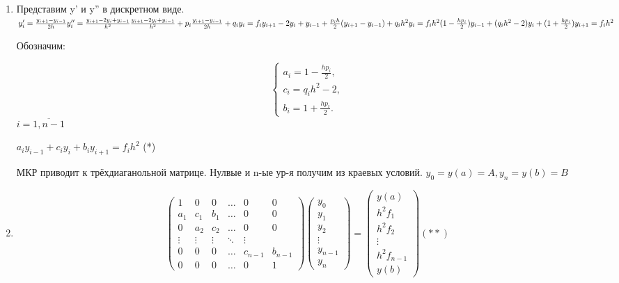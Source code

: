 \documentclass{article}
\begin{document}
	\begin{enumerate}
		\item Представим y' и y'' в дискретном виде.
		$\\y'_i = \frac{y_{i+1} -  y_{i-1}}{2h}\\
		y''_i = \frac{y_{i+1} -2y_{i} + y_{i-1}}{h^2}\\
		\frac{y_{i+1} -2y_{i} + y_{i-1}}{h^2} + p_i\frac{y_{i+1} -  y_{i-1}}{2h} + q_iy_i = f_i\\
		y_{i+1} -2y_{i} + y_{i-1} + \frac{p_ih}{2}(y_{i+1} -  y_{i-1})+q_ih^2y_i = f_ih^2\\
		(1-\frac{hp_i}{2})y_{i-1} + (q_ih^2-2)y_i + (1+\frac{hp_i}{2})y_{i+1} = f_ih^2\\
		$
		
		Обозначим:
		
		\begin{equation*}
			\begin{cases}
				a_i = 1-\frac{hp_i}{2},
				\\
				c_i = q_ih^2-2,
				\\
				b_i = 1+\frac{hp_i}{2}.
			\end{cases}
		\end{equation*}
		$i = \overline{1, n - 1}$
		
		$a_iy_{i-1} + c_iy_i + b_iy_{i+1} = f_ih^2$	(*)
		
		МКР приводит к трёхдиаганольной матрице. Нулвые и n-ые ур-я получим из краевых условий.
		$y_0=y(a)=A, y_n=y(b)=B$

		\item 	$$ 
		\left(
		\begin{array}{cccccc}
			1 & 0 & 0 & \ldots & 0 & 0\\
			a_1 & c_1 & b_1 & \ldots & 0 & 0\\
			0 & a_2 & c_2 & \ldots & 0 & 0 \\
			\vdots & \vdots& \vdots & \ddots & \vdots\\
			0 & 0 & 0 & \ldots & c_{n-1} & b_{n-1} \\
			0 & 0 & 0 & \ldots & 0 &1
		\end{array}
		\right) 
		\left(\begin{array}{c} 
			y_0\\ 
			y_1\\ 
			y_2\\
			\vdots\\
			y_{n-1}\\
			y_n 
		\end{array}\right)
		=
		\left(\begin{array}{c} 
			y(a)\\ 
			h^2f_1\\ 
			h^2f_2\\
			\vdots\\
			h^2f_{n-1}\\
			y(b) 
		\end{array}\right)
		(**)$$
		

\end{enumerate}
\end{document}
